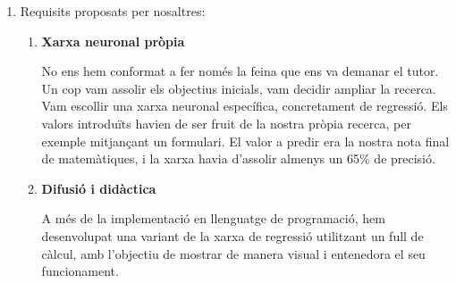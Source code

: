 \begin{enumerate}
    \item Requisits proposats per nosaltres:

    \begin{enumerate}

        \item \textbf{Xarxa neuronal pròpia}

        No ens hem conformat a fer només la feina que ens va demanar el tutor. Un cop vam assolir els objectius inicials, vam decidir ampliar la recerca. Vam escollir una xarxa neuronal específica, concretament de regressió. Els valors introduïts havien de ser fruit de la nostra pròpia recerca, per exemple mitjançant un formulari. El valor a predir era la nostra nota final de matemàtiques, i la xarxa havia d’assolir almenys un 65\% de precisió.

        \item \textbf{Difusió i didàctica}

        A més de la implementació en llenguatge de programació, hem desenvolupat una variant de la xarxa de regressió utilitzant un full de càlcul, amb l’objectiu de mostrar de manera visual i entenedora el seu funcionament.

    \end{enumerate}

\end{enumerate}

%
